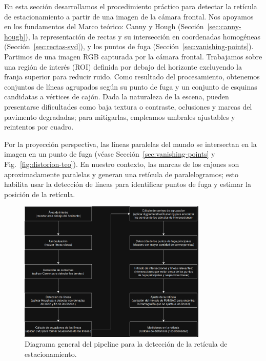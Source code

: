 \noindent
En esta sección desarrollamos el procedimiento práctico para detectar la
retícula de estacionamiento a partir de una imagen de la cámara frontal.
Nos apoyamos en los fundamentos del Marco teórico: Canny y Hough (Sección~\ref{sec:canny-hough}),
la representación de rectas y su intersección en coordenadas homogéneas
(Sección~\ref{sec:rectas-svd}), y los puntos de fuga (Sección~\ref{sec:vanishing-points}).
\noindent
Partimos de una imagen RGB capturada por la cámara frontal. Trabajamos sobre una región de interés (ROI)
definida por debajo del horizonte excluyendo la franja superior para reducir ruido.
Como resultado del procesamiento, obtenemos conjuntos de líneas agrupados según su punto de fuga y un conjunto de esquinas candidatas a vértices de cajón. Dada la naturaleza de la escena, pueden presentarse dificultades como baja textura o contraste, oclusiones y marcas del pavimento degradadas; para mitigarlas, empleamos umbrales ajustables y reintentos por cuadro.

\noindent
Por la proyección perspectiva, las líneas paralelas del mundo se intersectan en la imagen en un punto de fuga
(véase Sección~\ref{sec:vanishing-points} y Fig.~\ref{fig:distorion-teo}).
En nuestro contexto, las marcas de los cajones son aproximadamente paralelas y generan
una retícula de paralelogramos; esto habilita usar la detección de líneas para identificar puntos de fuga
y estimar la posición de la retícula.


\begin{figure}[!ht]
    \centering
    \includegraphics[width=0.8\textwidth]{img/3-metodo/piperline-reticule.png}
    \caption{Diagrama general del pipeline para la detección de la retícula de estacionamiento.}
    \label{fig:reticula-pipeline}
\end{figure}

